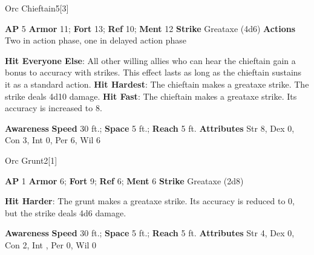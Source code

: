 \begin{monsection}{Orc Chieftain}{5}[3]
\vspace{-1em}\vspace{-1em}
\begin{spellcontent}
\begin{spelltargetinginfo}
{\textbf{AP} 5}
\pari \textbf{Armor} 11;
\textbf{Fort} 13;
\textbf{Ref} 10;
\textbf{Ment} 12
\pari \textbf{Strike} Greataxe  (4d6)
\pari \textbf{Actions} Two in action phase, one in delayed action phase
\end{spelltargetinginfo}
\begin{spelleffects}
\pari
\textbf{Hit Everyone Else}:
All other willing allies who can hear the chieftain gain a  bonus to accuracy with strikes.
This effect lasts as long as the chieftain sustains it as a standard action.
\vspace{0.5em}
\pari
\textbf{Hit Hardest}:
The chieftain makes a greataxe strike.
The strike deals 4d10 damage.
\vspace{0.5em}
\pari
\textbf{Hit Fast}:
The chieftain makes a greataxe strike.
Its accuracy is increased to 8.
\end{spelleffects}
\end{spellcontent}
\begin{spellsubcontent}
\begin{spellfooter}
\pari \textbf{Awareness} 
\pari \textbf{Speed} 30 ft.;
\textbf{Space} 5 ft.;
\textbf{Reach} 5 ft.
\pari \textbf{Attributes}
Str 8,
Dex 0,
Con 3,
Int 0,
Per 6,
Wil 6
\end{spellfooter}
\end{spellsubcontent}
\end{monsection}
\begin{monsection}{Orc Grunt}{2}[1]
\vspace{-1em}\vspace{-1em}
\begin{spellcontent}
\begin{spelltargetinginfo}
{\textbf{AP} 1}
\pari \textbf{Armor} 6;
\textbf{Fort} 9;
\textbf{Ref} 6;
\textbf{Ment} 6
\pari \textbf{Strike} Greataxe  (2d8)
\end{spelltargetinginfo}
\begin{spelleffects}
\pari
\textbf{Hit Harder}:
The grunt makes a greataxe strike.
Its accuracy is reduced to 0, but the strike deals 4d6 damage.
\end{spelleffects}
\end{spellcontent}
\begin{spellsubcontent}
\begin{spellfooter}
\pari \textbf{Awareness} 
\pari \textbf{Speed} 30 ft.;
\textbf{Space} 5 ft.;
\textbf{Reach} 5 ft.
\pari \textbf{Attributes}
Str 4,
Dex 0,
Con 2,
Int ,
Per 0,
Wil 0
\end{spellfooter}
\end{spellsubcontent}
\end{monsection}
